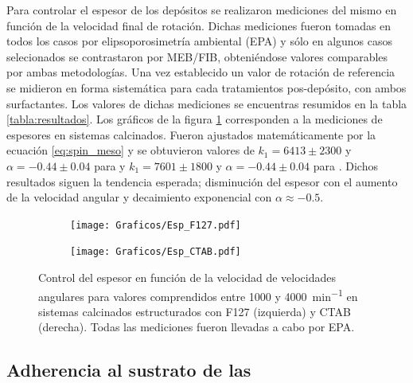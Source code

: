 		Para controlar el espesor de los depósitos se realizaron mediciones del mismo en función de la velocidad final de rotación.  Dichas mediciones fueron tomadas en todos los casos por elipsoporosimetría ambiental (EPA) y sólo en algunos casos selecionados se contrastaron por MEB/FIB, obteniéndose valores comparables por ambas metodologías. Una vez establecido un valor de rotación de referencia se midieron en forma sistemática para cada tratamientos pos-depósito, con ambos surfactantes. Los valores de dichas mediciones se encuentras resumidos en la tabla \ref{tabla:resultados}.
		Los gráficos de la figura \ref{fig:esp} corresponden a la mediciones de espesores en sistemas calcinados. Fueron ajustados matemáticamente por la ecuación \ref{eq:spin_meso} y se obtuvieron valores de $k_1=6413\pm 2300$ y $\alpha=-0.44 \pm 0.04$ para \pdmF\space y $k_1=7601\pm 1800$ y $\alpha=-0.44 \pm 0.04$ para \pdmC. Dichos resultados siguen la tendencia esperada; disminución del espesor con el aumento de la velocidad angular y decaimiento exponencial con $\alpha \approx -0.5$. 

		
			\begin{figure}[!ht]
				\begin{subfigure}[t]{0.495\textwidth}
				\texttt{[image: Graficos/Esp\_F127.pdf]}
				\end{subfigure}
				\begin{subfigure}[t]{0.495\textwidth}
				\texttt{[image: Graficos/Esp\_CTAB.pdf]}
				\end{subfigure}
				\caption[Espesor en función de la velocidad angular]{Control del espesor en función de la velocidad de velocidades angulares para valores comprendidos entre 1000 y \SI{4000}{\minute^{-1}} en sistemas calcinados estructurados con F127 (izquierda) y CTAB (derecha). Todas las mediciones fueron llevadas a cabo por EPA.}
				\label{fig:esp}		
				\end{figure}
	
	\subsection{Adherencia al sustrato de las \pdm}	

